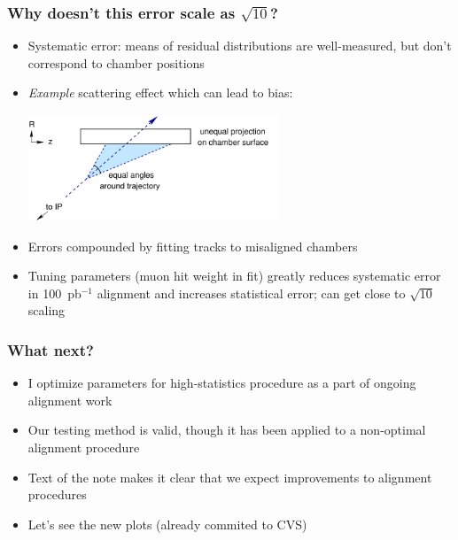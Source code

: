 \documentclass[compress]{beamer}
\begin{document}
\begin{frame}
\frametitle{Why doesn't this error scale as $\sqrt{10}$?}
\begin{itemize}
\item Systematic error: means of residual distributions are well-measured, but don't correspond to chamber positions

\item {\it Example} scattering effect which can lead to bias:

\begin{center} \includegraphics[width=7.5cm]{example.pdf} \end{center}

\item Errors compounded by fitting tracks to misaligned chambers

\item Tuning parameters (muon hit weight in fit) greatly reduces systematic
error in 100~pb$^{-1}$ alignment and increases statistical error; can
get close to $\sqrt{10}$ scaling

\end{itemize}
\end{frame}

\begin{frame}
\frametitle{What next?}
\begin{itemize}\setlength{\itemsep}{0.5 cm}
\item I optimize parameters for high-statistics procedure as a part of ongoing alignment work

\item Our testing method is valid, though it has been applied to a non-optimal alignment procedure

\item Text of the note makes it clear that we expect improvements to alignment procedures

\item Let's see the new plots (already commited to CVS)
\end{itemize}
\end{frame}
\end{document}
